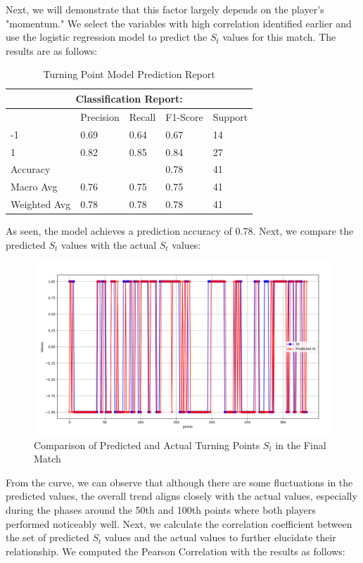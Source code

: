 \documentclass[UTF8]{ctexart} %
\begin{document}
Next, we will demonstrate that this factor largely depends on the player's "momentum." We select 
the variables with high correlation identified earlier and use the logistic regression model to 
predict the \(S_t\) values for this match. The results are as follows:

\begin{table}[H]
    \caption{Turning Point Model Prediction Report}
    \centering
    \begin{tabularx}{0.95\textwidth}{XXXXX}
    \toprule
    \multicolumn{5}{c}{Classification Report:}\\
    \midrule
     & Precision & Recall & F1-Score & Support \\
    -1 & 0.69 & 0.64 & 0.67 & 14  \\
    1 & 0.82 & 0.85 & 0.84 & 27  \\ 
    \midrule
    Accuracy &  &  & 0.78 & 41  \\
    Macro Avg & 0.76 & 0.75 & 0.75 & 41  \\
    Weighted Avg & 0.78 & 0.78 & 0.78 & 41  \\
    \bottomrule
    \end{tabularx}
\end{table}

As seen, the model achieves a prediction accuracy of 0.78. Next, we compare the predicted \(S_t\) 
values with the actual \(S_t\) values:

\begin{figure}[H]
    \centering
    \includegraphics[width=\textwidth]{./graph/predict_swings.png}
    \caption{Comparison of Predicted and Actual Turning Points \(S_t\) in the Final Match}
\end{figure}

From the curve, we can observe that although there are some fluctuations in the predicted values, the 
overall trend aligns closely with the actual values, especially during the phases around the 50th and 
100th points where both players performed noticeably well. Next, we calculate the correlation coefficient 
between the set of predicted \(S_t\) values and the actual values to further elucidate their relationship. 
We computed the Pearson Correlation with the results as follows:
\end{document}
